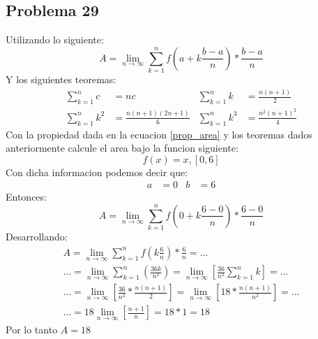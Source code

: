 \documentclass{article}
\begin{document}
\subsection{Problema 29}
Utilizando lo siguiente:
\begin{equation} \label{prop_area}
  A = \lim_{n\to\infty} \sum_{k=1}^{n} f\left(a+k\frac{b-a}{n}\right)* \frac{b-a}{n}
\end{equation}
Y los siguientes teoremas:
\begin{align*}
  \sum_{k=1}^{n} c & = nc & \sum_{k=1}^{n} k & = \frac{n(n+1)}{2} \\ \sum_{k=1}^{n} k^2 &= \frac{n(n+1)(2n+1)}{6} & \sum_{k=1}^{n} k^3 &= \frac{n^2(n+1)^2}{4}
\end{align*}
Con la propiedad dada en la ecuacion \ref{prop_area} y los teoremas dados anteriormente calcule el area bajo la funcion siguiente:
\begin{equation}
  f(x) = x, [0,6]
\end{equation}
Con dicha informacion podemos decir que:
\begin{align*}
  a & = 0 & b & = 6
\end{align*}
Entonces:
\begin{equation}
  A = \lim_{n\to\infty} \sum_{k=1}^{n} f\left(0+k\frac{6-0}{n}\right)* \frac{6-0}{n}
\end{equation}
Desarrollando:
\begin{align*}
  A = \lim_{n\to\infty} \sum_{k=1}^{n} f\left(k\frac{6}{n}\right)* \frac{6}{n} =\dots \\\dots = \lim_{n\to\infty} \sum_{k=1}^{n} \left(\frac{36k}{n^2}\right)=\lim_{n\to\infty}\left[\frac{36}{n^2} \sum_{k=1}^{n} k\right]=\dots \\ \dots = \lim_{n\to\infty}\left[\frac{36}{n^2} *\frac{n(n+1)}{2}\right]=\lim_{n\to\infty} \left[18*\frac{n(n+1)}{n^2}\right]=\dots \\ \dots = 18\lim_{n\to\infty} \left[\frac{n+1}{n}\right]= 18*1=18
\end{align*}
Por lo tanto $A = 18$
\end{document}
